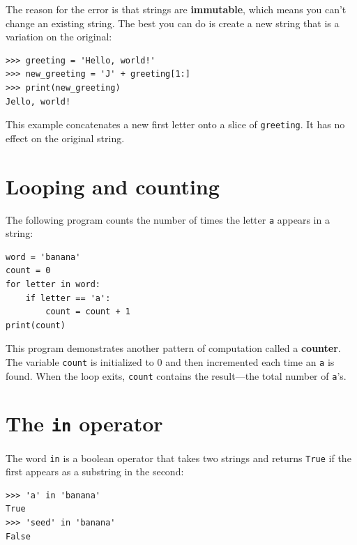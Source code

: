 
The reason for the error is that
strings are {\bf immutable}, which means you can't change an
existing string.  The best you can do is create a new string
that is a variation on the original:

\beforeverb
\begin{verbatim}
>>> greeting = 'Hello, world!'
>>> new_greeting = 'J' + greeting[1:]
>>> print(new_greeting)
Jello, world!
\end{verbatim}
\afterverb
%
This example concatenates a new first letter onto
a slice of {\tt greeting}.  It has no effect on
the original string.


\section{Looping and counting}
\label{counter}


\label{ch6LetterCount}
The following program counts the number of times the letter {\tt a}
appears in a string:

\beforeverb
\begin{verbatim}
word = 'banana'
count = 0
for letter in word:
    if letter == 'a':
        count = count + 1
print(count)
\end{verbatim}
\afterverb
%
This program demonstrates another pattern of computation called a {\bf
counter}.  The variable {\tt count} is initialized to 0 and then
incremented each time an {\tt a} is found.
When the loop exits, {\tt count}
contains the result---the total number of {\tt a}'s.

\section{The {\tt in} operator}
\label{inboth}


The word {\tt in} is a boolean operator that takes two strings and
returns {\tt True} if the first appears as a substring in the second:

\beforeverb
\begin{verbatim}
>>> 'a' in 'banana'
True
>>> 'seed' in 'banana'
False
\end{verbatim}
\afterverb
%


